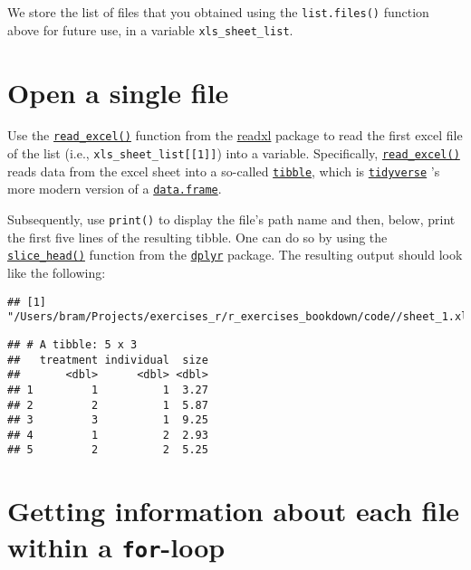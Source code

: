 \documentclass[
]{book}
\begin{document}
We store the list of files that you obtained using the \texttt{list.files()} function above for future use, in a variable \texttt{xls\_sheet\_list}.

\hypertarget{open-a-single-file}{%
\section{Open a single file}\label{open-a-single-file}}

Use the \href{https://readxl.tidyverse.org/reference/read_excel.html}{\texttt{read\_excel()}} function from the \href{https://readxl.tidyverse.org/}{readxl} package to read the first excel file of the list (i.e., \texttt{xls\_sheet\_list{[}{[}1{]}{]}}) into a variable. Specifically, \href{https://readxl.tidyverse.org/reference/read_excel.html}{\texttt{read\_excel()}} reads data from the excel sheet into a so-called \href{https://tibble.tidyverse.org/}{\texttt{tibble}}, which is \href{https://www.tidyverse.org/}{\texttt{tidyverse}} 's more modern version of a \href{https://stat.ethz.ch/R-manual/R-patched/library/base/html/data.frame.html}{\texttt{data.frame}}.

Subsequently, use \texttt{print()} to display the file's path name and then, below, print the first five lines of the resulting tibble. One can do so by using the \href{https://dplyr.tidyverse.org/reference/slice.html}{\texttt{slice\_head()}} function from the \href{https://dplyr.tidyverse.org/}{\texttt{dplyr}} package. The resulting output should look like the following:

\begin{verbatim}
## [1] "/Users/bram/Projects/exercises_r/r_exercises_bookdown/code//sheet_1.xls"
\end{verbatim}

\begin{verbatim}
## # A tibble: 5 x 3
##   treatment individual  size
##       <dbl>      <dbl> <dbl>
## 1         1          1  3.27
## 2         2          1  5.87
## 3         3          1  9.25
## 4         1          2  2.93
## 5         2          2  5.25
\end{verbatim}

\hypertarget{forLoop}{%
\section{\texorpdfstring{Getting information about each file within a \texttt{for}-loop}{Getting information about each file within a for-loop}}\label{forLoop}}
\end{document}
